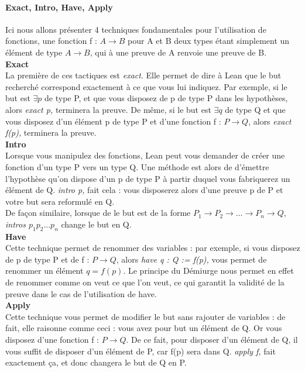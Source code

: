 \paragraph{Exact, Intro, Have, Apply}
Ici nous allons présenter 4 techniques fondamentales pour l'utilisation de fonctions, une fonction f : $A\to B$ pour A et B deux types étant simplement un élément de type $A\to B$, qui à une preuve de A renvoie une preuve de B.\\
\textbf{Exact}\\
La première de ces tactiques est \textit{exact}. Elle permet de dire à Lean que le but recherché correspond exactement à ce que vous lui indiquez. Par exemple, si le but est  $\exists  p$ de type P, et que vous disposez de p de type P dans les hypothèses, alors \textit{exact p,} terminera la preuve. De même, si le but est  $\exists  q$ de type Q et que vous disposez d'un élément p de type P et d'une fonction f : $P \to Q$, alors \textit{exact f(p),} terminera la preuve.\\
\textbf{Intro} \\
Lorsque vous manipulez des fonctions, Lean peut vous demander de créer une fonction d'un type P vers un type Q. Une méthode est alors de d'émettre l'hypothèse qu'on dispose d'un p de type P à partir duquel vous fabriquerez un élément de Q. \textit{intro p,} fait cela : vous disposerez alors d'une preuve p de P et votre but sera reformulé en Q. \\
De façon similaire, lorsque de le but est de la forme $P_1 \to P_2 \to ... \to P_n \to Q$, \textit{intros $p_1 p_2 ... p_n$} change le but en Q.\\
\textbf{Have} \\
Cette technique permet de renommer des variables : par exemple, si vous disposez de p de type P et de f : $P \to Q$, alors \textit{have q : Q := f(p),} vous permet de renommer un élément $q = f(p)$. Le principe du Démiurge nous permet en effet de renommer comme on veut ce que l'on veut, ce qui garantit la validité de la preuve dans le cas de l'utilisation de have. \\
\textbf{Apply}\\
Cette technique vous permet de modifier le but sans rajouter de variables : de fait, elle raisonne comme ceci : vous avez pour but un élément de Q. Or vous disposez d'une fonction f : $P \to Q$. De ce fait, pour disposer d'un élément de Q, il vous suffit de disposer d'un élément de P, car f(p) sera dans Q. \textit{apply f,} fait exactement ça, et donc changera le but de Q en P.\\

